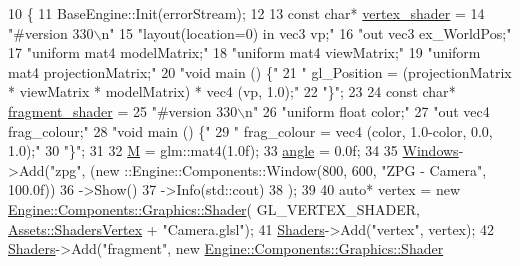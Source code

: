 \begin{DoxyCode}
10 \{
11     BaseEngine::Init(errorStream);
12 
13     \textcolor{keyword}{const} \textcolor{keywordtype}{char}* \mbox{\hyperlink{ZPGEngine_8cpp_afc33b8912f9f93d1d2544df04ad4a81a}{vertex\_shader}} =
14         \textcolor{stringliteral}{"#version 330\(\backslash\)n"}
15         \textcolor{stringliteral}{"layout(location=0) in vec3 vp;"}
16         \textcolor{stringliteral}{"out vec3 ex\_WorldPos;"}
17         \textcolor{stringliteral}{"uniform mat4 modelMatrix;"}
18         \textcolor{stringliteral}{"uniform mat4 viewMatrix;"}
19         \textcolor{stringliteral}{"uniform mat4 projectionMatrix;"}
20         \textcolor{stringliteral}{"void main () \{"}
21         \textcolor{stringliteral}{" gl\_Position = (projectionMatrix * viewMatrix * modelMatrix) * vec4 (vp, 1.0);"}
22         \textcolor{stringliteral}{"\}"};
23 
24     \textcolor{keyword}{const} \textcolor{keywordtype}{char}* \mbox{\hyperlink{ZPGEngine_8cpp_ab187f2ba2a2f72ea5571921a1a856582}{fragment\_shader}} =
25         \textcolor{stringliteral}{"#version 330\(\backslash\)n"}
26         \textcolor{stringliteral}{"uniform float color;"}
27         \textcolor{stringliteral}{"out vec4 frag\_colour;"}
28         \textcolor{stringliteral}{"void main () \{"}
29         \textcolor{stringliteral}{"     frag\_colour = vec4 (color, 1.0-color, 0.0, 1.0);"}
30         \textcolor{stringliteral}{"\}"};
31 
32     \mbox{\hyperlink{classApplication_1_1Engines_1_1CameraEngine_a2c5eb2ee7aa78a335df64d77242fb21c}{M}} = glm::mat4(1.0f);
33     \mbox{\hyperlink{classApplication_1_1Engines_1_1CameraEngine_a5298e9f5fa1a2984e21274c4524f771c}{angle}} = 0.0f;
34 
35     \mbox{\hyperlink{classEngine_1_1BaseEngine_a4a1a4c4dae052e66ecc4f326eeed4d33}{Windows}}->Add(\textcolor{stringliteral}{"zpg"}, (new ::Engine::Components::Window(800, 600, \textcolor{stringliteral}{"ZPG - Camera"}, 100.0f))
36         ->Show()
37         ->Info(std::cout)
38     );
39 
40     \textcolor{keyword}{auto}* vertex = \textcolor{keyword}{new} \mbox{\hyperlink{classEngine_1_1Components_1_1Graphics_1_1Shader}{Engine::Components::Graphics::Shader}}(
      GL\_VERTEX\_SHADER, \mbox{\hyperlink{classAssets_ac712d5aca276086a3734e2e9f74cfc6b}{Assets::ShadersVertex}} + \textcolor{stringliteral}{"Camera.glsl"});
41     \mbox{\hyperlink{classEngine_1_1BaseEngine_a2582dee3f73da82bb422b43317b85e3b}{Shaders}}->Add(\textcolor{stringliteral}{"vertex"}, vertex);
42     \mbox{\hyperlink{classEngine_1_1BaseEngine_a2582dee3f73da82bb422b43317b85e3b}{Shaders}}->Add(\textcolor{stringliteral}{"fragment"}, \textcolor{keyword}{new} \mbox{\hyperlink{classEngine_1_1Components_1_1Graphics_1_1Shader}{Engine::Components::Graphics::Shader}}

\end{DoxyCode}
